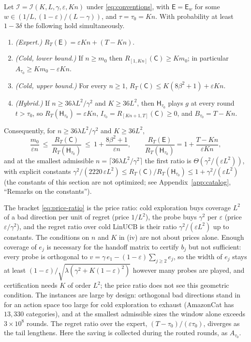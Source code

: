 \documentclass[anon]{alt2027} %
\newcommand{\eps}{\varepsilon}
\newcommand{\Cold}{\mathsf{C}}
\newcommand{\Exp}{\mathsf{E}}
\newcommand{\Hyb}{\mathsf{H}}
\begin{document}
\begin{theorem}
\label{thm:price}
Let $\mathcal I=\mathcal I(K,L,\gamma,\eps,Kn)$ under \eqref{eq:conventions}, with
$\Exp=\Exp_w$ for some $w\in(1/L,(1-\eps)/(L-\gamma))$, and $\tau=\tau_0=Kn$. With
probability at least $1-3\delta$ the following hold simultaneously.
\begin{enumerate}[itemsep=1pt,topsep=1pt,leftmargin=*]
\item[(i)] \emph{(Expert.)} $R_T(\Exp)=\eps Kn+(T-Kn)$.
\item[(ii)] \emph{(Cold, lower bound.)} If $n\ge m_0$ then
$R_{[1,Kn]}(\Cold)\ge Km_0$; in particular $A_{\tau_0}\ge Km_0-\eps Kn$.
\item[(iii)] \emph{(Cold, upper bound.)} For every $n\ge1$, $R_T(\Cold)\le K(8\beta^2+1)+\eps Kn$.
\item[(iv)] \emph{(Hybrid.)} If $n\ge36\lambda L^2/\gamma^2$ and $K\ge36L^2$, then
$\Hyb_{\tau_0}$ plays $g$ at every round $t>\tau_0$, so
$R_T(\Hyb_{\tau_0})=\eps Kn$, $I_{\tau_0}=R_{[Kn+1,T]}(\Cold)\ge0$, and
$B_{\tau_0}=T-Kn$.
\end{enumerate}
Consequently, for $n\ge36\lambda L^2/\gamma^2$ and $K\ge36L^2$,
\begin{equation}
\label{eq:price-ratio}
\frac{m_0}{\eps n}\ \le\ \frac{R_T(\Cold)}{R_T(\Hyb_{\tau_0})}\ \le\ 1+\frac{8\beta^2+1}{\eps n},
\qquad
\frac{R_T(\Exp)}{R_T(\Hyb_{\tau_0})}=1+\frac{T-Kn}{\eps Kn},
\end{equation}
and at the smallest admissible $n=\lceil36\lambda L^2/\gamma^2\rceil$ the first
ratio is $\Theta(\gamma^2/(\eps L^2))$, with explicit constants
$\gamma^2/(2220\,\eps L^2)\le R_T(\Cold)/R_T(\Hyb_{\tau_0})\le1+\gamma^2/(\eps L^2)$
(the constants of this section are not optimized; see
Appendix~\ref{app:catalog}, ``Remarks on the constants'').
\end{theorem}

The bracket \eqref{eq:price-ratio} is the price ratio: cold exploration buys
coverage $L^2$ of a bad direction per unit of regret (price $1/L^2$), the
probe buys $\gamma^2$ per $\eps$ (price $\eps/\gamma^2$), and the regret ratio over cold
LinUCB is their ratio $\gamma^2/(\eps L^2)$ up to constants. The conditions on
$n$ and $K$ in (iv) are not about prices alone. Enough coverage of $e_j$ is
necessary for the handoff matrix to certify $b_j$ but not sufficient: every
probe is orthogonal to $v=\gamma\,e_1-(1-\eps)\sum_{j\ge2}e_j$, so the width of
$e_j$ stays at least $(1-\eps)/\sqrt{\lambda(\gamma^2+K(1-\eps)^2)}$ however many
probes are played, and certification needs $K$ of order $L^2$; the price
ratio does not see this geometric condition. The instances are large by
design: orthogonal bad directions stand in for an action space too large for
cold exploration to exhaust (AmazonCat has $13{,}330$ categories), and at the
smallest admissible sizes the window alone exceeds $3\times10^8$ rounds. The regret ratio over
the expert, $(T-\tau_0)/(\eps\tau_0)$, diverges as the tail lengthens. Here
the saving is collected during the routed rounds, as $A_{\tau_0}$.
\end{document}
